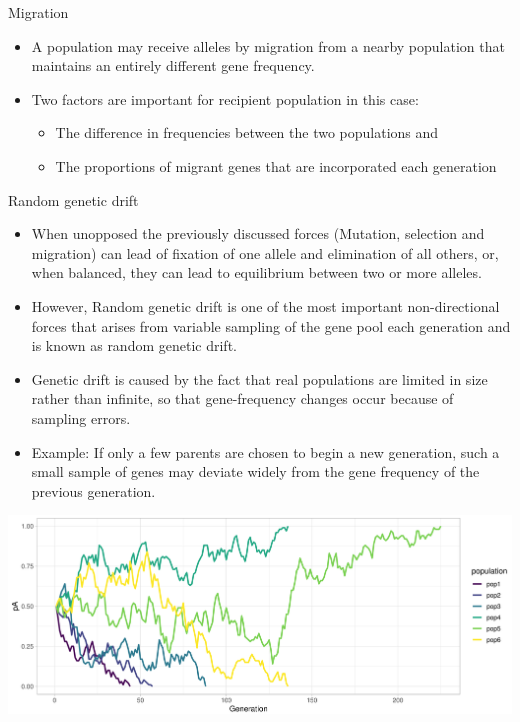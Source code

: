 \documentclass[11pt,ignorenonframetext,aspectratio=169]{beamer}
\providecommand{\tightlist}{%
  \setlength{\itemsep}{0pt}\setlength{\parskip}{0pt}}
\begin{document}
\begin{frame}{Migration}
\protect\hypertarget{migration}{}
\begin{itemize}
\tightlist
\item
  A population may receive alleles by migration from a nearby population
  that maintains an entirely different gene frequency.
\item
  Two factors are important for recipient population in this case:

  \begin{itemize}
  \tightlist
  \item
    The difference in frequencies between the two populations and
  \item
    The proportions of migrant genes that are incorporated each
    generation
  \end{itemize}
\end{itemize}
\end{frame}

\begin{frame}{Random genetic drift}
\protect\hypertarget{random-genetic-drift}{}
\small

\begin{itemize}
\tightlist
\item
  When unopposed the previously discussed forces (Mutation, selection
  and migration) can lead of fixation of one allele and elimination of
  all others, or, when balanced, they can lead to equilibrium between
  two or more alleles.
\item
  However, Random genetic drift is one of the most important
  non-directional forces that arises from variable sampling of the gene
  pool each generation and is known as random genetic drift.
\item
  Genetic drift is caused by the fact that real populations are limited
  in size rather than infinite, so that gene-frequency changes occur
  because of sampling errors.
\item
  Example: If only a few parents are chosen to begin a new generation,
  such a small sample of genes may deviate widely from the gene
  frequency of the previous generation.
\end{itemize}

\begin{center}\includegraphics[width=0.54\linewidth]{./images/genetic_drift_simulation} \end{center}
\end{frame}
\end{document}
